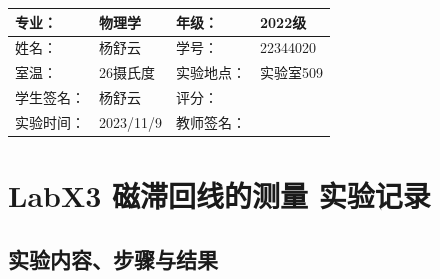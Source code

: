 \documentclass[dvipsnames, svgnames,a4paper,11pt]{article}
\begin{document}
	
	
	\clearpage
	\begin{table}
		\renewcommand\arraystretch{1.7}
		\centering
		\begin{tabularx}{\textwidth}{|X|X|X|X|}
			\hline
			专业： & 物理学 & 年级： & 2022级 \\
			\hline
			姓名： & 杨舒云 & 学号： & 22344020\\
			\hline
			室温： & 26摄氏度 & 实验地点： & 实验室509 \\
			\hline
			学生签名：& 杨舒云 & 评分： &\\
			\hline
			实验时间：& 2023/11/9 & 教师签名：&\\
			\hline
		\end{tabularx}
	\end{table}
	
	\section{LabX3 磁滞回线的测量 \quad\heiti 实验记录}
	\subsection{实验内容、步骤与结果}
\end{document}
